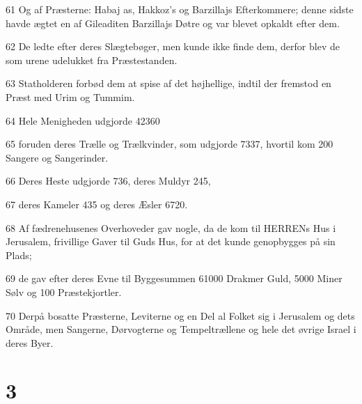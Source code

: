 \par 61 Og af Præsterne: Habaj as, Hakkoz's og Barzillajs Efterkommere; denne sidste havde ægtet en af Gileaditen Barzillajs Døtre og var blevet opkaldt efter dem.
\par 62 De ledte efter deres Slægtebøger, men kunde ikke finde dem, derfor blev de som urene udelukket fra Præstestanden.
\par 63 Statholderen forbød dem at spise af det højhellige, indtil der fremstod en Præst med Urim og Tummim.
\par 64 Hele Menigheden udgjorde 42360
\par 65 foruden deres Trælle og Trælkvinder, som udgjorde 7337, hvortil kom 200 Sangere og Sangerinder.
\par 66 Deres Heste udgjorde 736, deres Muldyr 245,
\par 67 deres Kameler 435 og deres Æsler 6720.
\par 68 Af fædrenehusenes Overhoveder gav nogle, da de kom til HERRENs Hus i Jerusalem, frivillige Gaver til Guds Hus, for at det kunde genopbygges på sin Plads;
\par 69 de gav efter deres Evne til Byggesummen 61000 Drakmer Guld, 5000 Miner Sølv og 100 Præstekjortler.
\par 70 Derpå bosatte Præsterne, Leviterne og en Del al Folket sig i Jerusalem og dets Område, men Sangerne, Dørvogterne og Tempeltrællene og hele det øvrige Israel i deres Byer.

\chapter{3}

